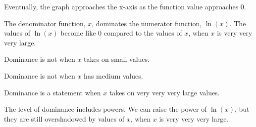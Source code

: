 \documentclass{ximera}
\begin{document}
\begin{example}
\begin{image}
\end{image}






Eventually, the graph approaches the x-axis as the function value approaches $0$. 


The denominator function, $x$, dominates the numerator function, $\ln(x)$.   The values of $\ln(x)$ become like $0$ compared to the values of $x$, when $x$ is very very very large. 

Dominance is not when $x$ takes on small values.  

Dominance is not when $x$ has medium values.  

Dominance is a statement when $x$ takes on very very very large values.




\end{example}







The level of dominance includes powers.  We can raise the power of $\ln(x)$, but they are still overshadowed by values of $x$, when $x$ is very very very large. 
\end{document}
